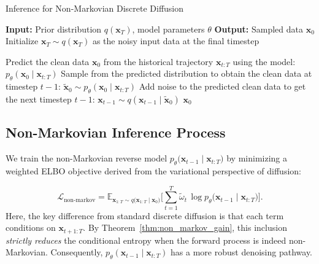\begin{algorithm}[t]
    \caption{Inference for Non-Markovian Discrete Diffusion}
    \label{alg:non_markov_inference}
    \begin{algorithmic}[1]
    \State \textbf{Input:} Prior distribution $q(\mathbf{x}_T)$, model parameters $\theta$
    \State \textbf{Output:} Sampled data $\mathbf{x}_0$
    \State Initialize $\mathbf{x}_T \sim q(\mathbf{x}_T)$ as the noisy input data at the final timestep
    
        \State Predict the clean data $\mathbf{x}_{0}$ from the historical trajectory $\mathbf{x}_{t:T}$ using the model:
        $p_\theta\left( \mathbf{x}_{0} \mid \mathbf{x}_{t:T} \right)$
        \State Sample from the predicted distribution to obtain the clean data at timestep $t-1$: 
        $\widetilde{\mathbf{x}}_{0} \sim p_\theta\left( \mathbf{x}_{0} \mid \mathbf{x}_{t:T} \right)$
        \State Add noise to the predicted clean data to get the next timestep $t-1$:
        $\mathbf{x}_{t-1} \sim q\left( \mathbf{x}_{t-1} \mid \widetilde{\mathbf{x}}_{0} \right)$
        \EndFor
    \State \Return $\mathbf{x}_0$
    \end{algorithmic}
    \end{algorithm}


    
\subsection{Non-Markovian Inference Process}
We train the non-Markovian reverse model 
\(
p_\theta\bigl(\mathbf{x}_{t-1} \mid \mathbf{x}_{t:T}\bigr)
\)
by minimizing a weighted ELBO objective derived from the variational perspective of diffusion:

\begin{equation}
    \mathcal{L}_{\text{non-markov}} = 
    \mathbb{E}_{\mathbf{x}_{1: T} \sim q\bigl( \mathbf{x}_{1:T} \mid \mathbf{x}_0\bigr)}
    \Biggl[
        \sum_{t=1}^T \tilde{\omega}_t \,\log p_\theta\bigl(\mathbf{x}_{t-1} \mid \mathbf{x}_{t:T}\bigr)
    \Biggr].
\end{equation}
Here, the key difference from standard discrete diffusion is that each term conditions on \(\mathbf{x}_{t+1: T}\). By Theorem~\ref{thm:non_markov_gain}, this inclusion \textit{strictly reduces} the conditional entropy when the forward process is indeed non-Markovian. Consequently, \(p_\theta\left(\mathbf{x}_{t-1} \mid \mathbf{x}_{t: T}\right)\) has a more robust denoising pathway.

